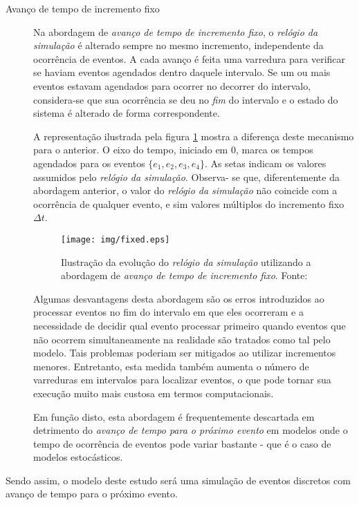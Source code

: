 \begin{description}
\item[Avanço de tempo de incremento fixo] \hfill

Na abordagem de \textit{avanço de tempo de incremento fixo}, o \textit{relógio
da simulação} é alterado sempre no mesmo incremento, independente da ocorrência
de eventos. A cada avanço é feita uma varredura para verificar se haviam eventos
agendados dentro daquele intervalo. Se um ou mais eventos estavam agendados para
ocorrer no decorrer do intervalo, considera-se que sua ocorrência se deu no
\textit{fim} do intervalo e o estado do sistema é alterado de forma
correspondente.

A representação ilustrada pela figura \ref{fig:fixedtime} mostra a diferença
deste mecanismo para o anterior. O eixo do tempo, iniciado em 0, marca os tempos
agendados para os eventos $\{e_{1}, e_{2}, e_{3}, e_{4}\}$. As
setas indicam os valores assumidos pelo \textit{relógio da simulação}. Observa-
se que, diferentemente da abordagem anterior, o valor do \textit{relógio da
simulação} não coincide com a ocorrência de qualquer evento, e sim valores
múltiplos do incremento fixo $\Delta t$.

\begin{figure}[htb!]
\centering\texttt{[image: img/fixed.eps]}
\caption[Avanço de tempo de incremento fixo]{\label{fig:fixedtime}Ilustração da evolução do \textit{relógio da simulação} utilizando a abordagem de \textit{avanço de tempo de incremento fixo}. Fonte:~\cite{Law}}
\end{figure}

Algumas desvantagens desta abordagem são os erros introduzidos ao processar
eventos no fim do intervalo em que eles ocorreram e a necessidade de decidir
qual evento processar primeiro quando eventos que não ocorrem simultaneamente na
realidade são tratados como tal pelo modelo. Tais problemas poderiam ser
mitigados ao utilizar incrementos menores. Entretanto, esta medida também
aumenta o número de varreduras em intervalos para localizar eventos, o que pode
tornar sua execução muito mais custosa em termos computacionais.

Em função disto, esta abordagem é frequentemente descartada em detrimento do
\textit{avanço de tempo para o próximo evento} em modelos onde o tempo de
ocorrência de eventos pode variar bastante - que é o caso de modelos
estocásticos.

\end{description}

Sendo assim, o modelo deste estudo será uma simulação de eventos discretos com avanço de tempo para o próximo evento.

